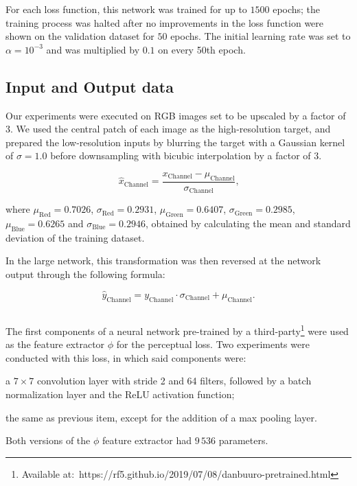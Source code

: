 For each loss function, this network was trained for up to $1500$ epochs; the training process was halted after no improvements in the loss function were shown on the validation dataset for $50$ epochs. The initial learning rate was set to ${\alpha = 10^{-3}}$ and was multiplied by $0.1$ on every 50th epoch.

\subsection{Input and Output data}

Our experiments were executed on RGB images set to be upscaled by a factor of $3$. We used the central patch of each image as the high-resolution target, and prepared the low-resolution inputs by blurring the target with a Gaussian kernel of ${\sigma = 1.0}$ before downsampling with bicubic interpolation by a factor of $3$.


\begin{equation}
    \hat{x}_{\text{Channel}} = \frac{x_{\text{Channel}} - \mu_{\text{Channel}}}{\sigma_{\text{Channel}}} \text{,}
\end{equation}

\noindent where $\mu_{\text{Red}} = 0.7026$, $\sigma_{\text{Red}} = 0.2931$, $\mu_{\text{Green}} = 0.6407$, $\sigma_{\text{Green}} = 0.2985$, $\mu_{\text{Blue}} = 0.6265$ and $\sigma_{\text{Blue}} = 0.2946$, obtained by calculating the mean and standard deviation of the training dataset.

In the large network, this transformation was then reversed at the network output through the following formula:

\begin{equation}
    \hat{y}_{\text{Channel}} = y_{\text{Channel}} \cdot \sigma_{\text{Channel}} + \mu_{\text{Channel}} \text{.}
\end{equation}

\subsection{}

The first components of a neural network pre-trained by a third-party\footnote{Available at:~https://rf5.github.io/2019/07/08/danbuuro-pretrained.html} were used as the feature extractor $\phi$ for the perceptual loss.
Two experiments were conducted with this loss, in which said components were:
\begin{enumerate*}
    \item a $7\times7$ convolution layer with stride 2 and 64 filters, followed by a batch normalization layer and the ReLU activation function;
    \item the same as previous item, except for the addition of a max pooling layer.
\end{enumerate*}
Both versions of the $\phi$ feature extractor had $9\,536$ parameters.


